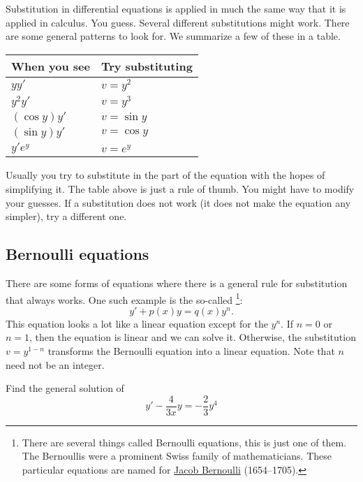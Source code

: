 \medskip

Substitution in differential equations is applied in much the same way that
it is applied in calculus.  You guess.  Several different substitutions might
work.  There are some general patterns to look for.  We summarize a few
of these in a table.

\begin{center}
\begin{tabular}{@{}ll@{}}
\toprule
When you see & Try substituting \\
\midrule
$yy'$ & $v=y^2$ \\
$y^2y'$ & $v=y^3$ \\
$(\cos y)y'$ & $v=\sin y$ \\
$(\sin y)y'$ & $v=\cos y$ \\
$y'e^y$ & $v=e^y$ \\ \bottomrule
\end{tabular}
\end{center}

Usually you try to substitute in the  part of the
equation with the hopes of simplifying it.  The table above is just a rule
of thumb.  You might have to modify your guesses.  If a substitution
does not work (it does not make the equation any simpler), try a different one.

\subsection{Bernoulli equations}

There are some forms of equations where there is a
general rule for substitution that always works.
One such example is the so-called
\emph{}%
\footnote{There are several things called Bernoulli equations, this is just one
of them.  The Bernoullis were a prominent Swiss family of mathematicians.  These
particular equations are named for
\href{https://en.wikipedia.org/wiki/Jacob_Bernoulli}{Jacob Bernoulli} (1654--1705).}:
\begin{equation*}
y' + p(x)y = q(x)y^n .
\end{equation*}
This equation
looks a lot like a linear equation except for the $y^n$.  If $n=0$ or
$n=1$, then the equation is linear and we can solve it.  Otherwise,
the substitution $v=y^{1-n}$ transforms the 
Bernoulli equation into a linear equation.  Note that $n$
need not be an integer.

\begin{example}
Find the general solution of
\begin{equation*}
y' - \frac{4}{3x}y = -\frac{2}{3}y^4 
\end{equation*}
\end{example}

